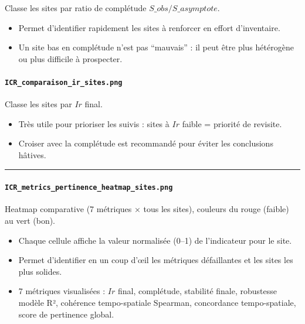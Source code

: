 Classe les sites par ratio de complétude \(S\_{obs}/S\_{asymptote}\).

\begin{itemize}
\tightlist
\item
  Permet d'identifier rapidement les sites à renforcer en effort
  d'inventaire.
\item
  Un site bas en complétude n'est pas ``mauvais'' : il peut être plus
  hétérogène ou plus difficile à prospecter.
\end{itemize}

\paragraph{\texorpdfstring{\texttt{ICR\_comparaison\_ir\_sites.png}}{ICR\_comparaison\_ir\_sites.png}}\label{icr_comparaison_ir_sites.png}

Classe les sites par \(Ir\) final.

\begin{itemize}
\tightlist
\item
  Très utile pour prioriser les suivis : sites à \(Ir\) faible =
  priorité de revisite.
\item
  Croiser avec la complétude est recommandé pour éviter les conclusions
  hâtives.
\end{itemize}

\begin{center}\rule{0.5\linewidth}{0.5pt}\end{center}

\paragraph{\texorpdfstring{\texttt{ICR\_metrics\_pertinence\_heatmap\_sites.png}}{ICR\_metrics\_pertinence\_heatmap\_sites.png}}\label{icr_metrics_pertinence_heatmap_sites.png}

Heatmap comparative (7 métriques × tous les sites), couleurs du rouge
(faible) au vert (bon).

\begin{itemize}
\tightlist
\item
  Chaque cellule affiche la valeur normalisée (0--1) de l'indicateur
  pour le site.
\item
  Permet d'identifier en un coup d'œil les métriques défaillantes et les
  sites les plus solides.
\item
  7 métriques visualisées : \(Ir\) final, complétude, stabilité finale,
  robustesse modèle R², cohérence tempo-spatiale Spearman, concordance
  tempo-spatiale, score de pertinence global.
\end{itemize}

